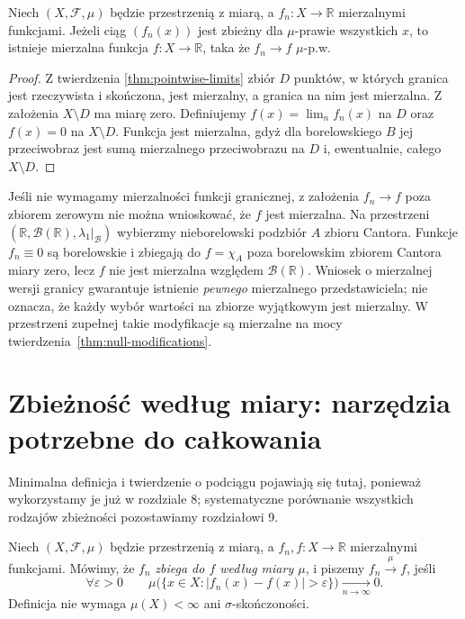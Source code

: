 \begin{wniosek}\label{idx:06:wniosek:15}

Niech $(X,\mathcal F,\mu)$ będzie przestrzenią z miarą,
a $f_n:X\to\mathbb R$ mierzalnymi funkcjami.
Jeżeli ciąg $(f_n(x))$ jest zbieżny dla
$\mu$-prawie wszystkich $x$, to istnieje
mierzalna funkcja $f:X\to\mathbb R$, taka że
$f_n\to f$ $\mu$-p.w.
\end{wniosek}
\begin{proof}
Z twierdzenia \ref{thm:pointwise-limits} zbiór $D$
punktów, w których granica jest rzeczywista i
skończona, jest mierzalny, a granica na nim jest mierzalna.
Z założenia $X\setminus D$ ma miarę zero.
Definiujemy $f(x)=\lim_nf_n(x)$ na $D$ oraz
$f(x)=0$ na $X\setminus D$. Funkcja jest mierzalna,
gdyż dla borelowskiego $B$ jej przeciwobraz jest
sumą mierzalnego przeciwobrazu na $D$ i,
ewentualnie, całego $X\setminus D$.
\end{proof}

\begin{uwaga}
\label{rem:noncomplete-ae-limit-6}
Jeśli nie wymagamy mierzalności funkcji granicznej,
z założenia $f_n\to f$ poza zbiorem zerowym nie można
wnioskować, że $f$ jest mierzalna. Na przestrzeni
$(\mathbb R,\mathcal B(\mathbb R),\lambda_1|_{\mathcal B})$
wybierzmy nieborelowski podzbiór $A$ zbioru Cantora.
Funkcje $f_n\equiv0$ są borelowskie i zbiegają do
$f=\chi_A$ poza borelowskim zbiorem Cantora miary zero,
lecz $f$ nie jest mierzalna względem $\mathcal B(\mathbb R)$.
Wniosek o mierzalnej wersji granicy gwarantuje istnienie
\emph{pewnego} mierzalnego przedstawiciela; nie oznacza,
że każdy wybór wartości na zbiorze wyjątkowym jest
mierzalny. W przestrzeni zupełnej takie modyfikacje są
mierzalne na mocy twierdzenia~\ref{thm:null-modifications}.
\end{uwaga}

\section{Zbieżność według miary: narzędzia potrzebne do całkowania}
Minimalna definicja i twierdzenie o podciągu pojawiają się tutaj,
ponieważ wykorzystamy je już w rozdziale 8; systematyczne porównanie
wszystkich rodzajów zbieżności pozostawiamy rozdziałowi 9.


\begin{definicja}
\label{def:convergence-measure}
Niech $(X,\mathcal F,\mu)$ będzie przestrzenią z miarą,
a $f_n,f:X\to\mathbb R$ mierzalnymi funkcjami.
Mówimy, że $f_n$ \emph{zbiega do $f$ według miary $\mu$},
i piszemy $f_n\xrightarrow{\mu}f$, jeśli
\[
\forall\varepsilon>0\qquad
\mu\bigl(\{x\in X:|f_n(x)-f(x)|>\varepsilon\}\bigr)
\xrightarrow[n\to\infty]{}0.
\]
Definicja nie wymaga $\mu(X)<\infty$ ani
$\sigma$-skończoności.
\end{definicja}

